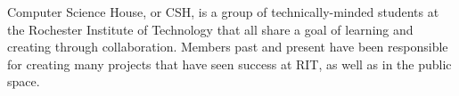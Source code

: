 \documentclass[margin,line]{resume}
\begin{document}
\begin{resume}
\begin{asparablank}
        \small Computer Science House, or CSH, is a group of technically-minded students at the Rochester Institute of Technology that all share a goal of learning and creating through collaboration. Members past and present have been responsible for creating many projects that have seen success at RIT, as well as in the public space.
	\end{asparablank}
    

\end{resume}
\end{document}
